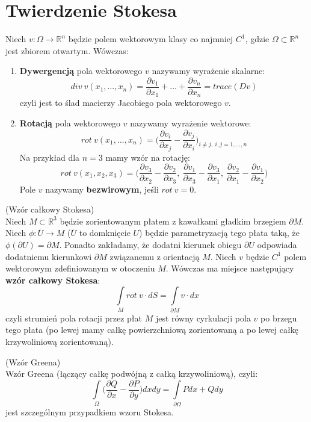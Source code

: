 \section{Twierdzenie Stokesa}

\begin{df}
	Niech $v:\Omega\rightarrow\mathbb{R}^n$ będzie polem wektorowym klasy co najmniej $C^1$, gdzie $\Omega\subset\mathbb{R}^n$ jest zbiorem otwartym. Wówczas:
	\begin{enumerate}[\rm 1.]
		\item
		\textbf{Dywergencją} pola wektorowego $v$ nazywamy wyrażenie skalarne: $$div\ v(x_1,\ldots,x_n)=\dfrac{\partial v_1}{\partial x_1}+\ldots+\dfrac{\partial v_n}{\partial x_n}=trace(Dv)$$ czyli jest to ślad macierzy Jacobiego pola wektorowego $v$.
		\item
		\textbf{Rotacją} pola wektorowego $v$ nazywamy wyrażenie wektorowe: $$rot\ v(x_1,\ldots,x_n)=\Bigg(\dfrac{\partial v_i}{\partial x_j}-\dfrac{\partial v_j}{\partial x_i}\Bigg)_{i\neq j,\ i,j=1,\ldots,n}$$ Na przykład dla $n=3$ mamy wzór na rotację: $$rot\ v(x_1,x_2,x_3)=\Bigg(\dfrac{\partial v_3}{\partial x_2}-\dfrac{\partial v_2}{\partial x_3},\ \dfrac{\partial v_1}{\partial x_3}-\dfrac{\partial v_3}{\partial x_1},\ \dfrac{\partial v_2}{\partial x_1}-\dfrac{\partial v_1}{\partial x_2}\Bigg)$$ Pole $v$ nazywamy \textbf{bezwirowym}, jeśli $rot\ v=0$.
	\end{enumerate}
\end{df}

\begin{tw}{(Wzór całkowy Stokesa)}\\
	Niech $M\subset\mathbb{R}^3$ będzie zorientowanym płatem z kawałkami gładkim brzegiem $\partial M$. Niech $\phi:\overline{U}\rightarrow M$ ($\overline{U}$ to domknięcie $U$) będzie parametryzacją tego płata taką, że $\phi(\partial U)=\partial M$. Ponadto zakładamy, że dodatni kierunek obiegu $\partial U$ odpowiada dodatniemu kierunkowi $\partial M$ związanemu z orientacją $M$. Niech $v$ będzie $C^1$ polem wektorowym zdefiniowanym w otoczeniu $M$. Wówczas ma miejsce następujący \textbf{wzór całkowy Stokesa}: $$\int\limits_M rot\ v\cdot dS=\int\limits_{\partial M}v\cdot dx$$ czyli strumień pola rotacji przez płat $M$ jest równy cyrkulacji pola $v$ po brzegu tego płata (po lewej mamy całkę powierzchniową zorientowaną a po lewej całkę krzywoliniową zorientowaną).
\end{tw}

\begin{wnsk}{(Wzór Greena)}\\
	Wzór Greena (łączący całkę podwójną z całką krzywoliniową), czyli: $$\int\limits_\Omega\Bigg(\dfrac{\partial Q}{\partial x}-\dfrac{\partial P}{\partial y}\Bigg)dxdy=\int\limits_{\partial\Omega}Pdx+Qdy$$ jest szczególnym przypadkiem wzoru Stokesa.
\end{wnsk}

